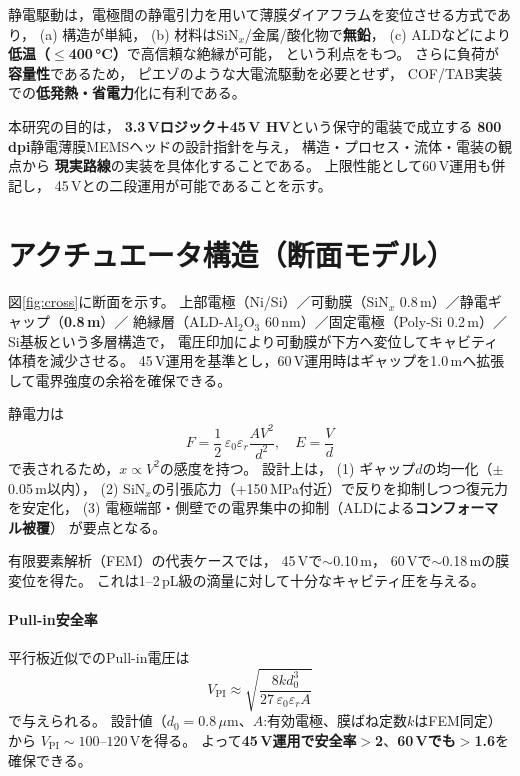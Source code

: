\documentclass[conference]{IEEEtran}
\begin{document}
静電駆動は，電極間の静電引力を用いて薄膜ダイアフラムを変位させる方式であり，
(a) 構造が単純，
(b) 材料はSiN$_x$/金属/酸化物で\textbf{無鉛}，
(c) ALDなどにより\textbf{低温（$\le$400\,\si{\celsius}）}で高信頼な絶縁が可能，
という利点をもつ。
さらに負荷が\textbf{容量性}であるため，
ピエゾのような大電流駆動を必要とせず，
COF/TAB実装での\textbf{低発熱・省電力}化に有利である。

本研究の目的は，
\textbf{3.3\,Vロジック＋45\,V HV}という保守的電装で成立する
\textbf{800\,dpi}静電薄膜MEMSヘッドの設計指針を与え，
構造・プロセス・流体・電装の観点から
\textbf{現実路線}の実装を具体化することである。
上限性能として60\,V運用も併記し，
45\,Vとの二段運用が可能であることを示す。

\section{アクチュエータ構造（断面モデル）}
図\ref{fig:cross}に断面を示す。
上部電極（Ni/Si）／可動膜（SiN$_x$ 0.8\,\textmu m）／静電ギャップ（\textbf{0.8\,\textmu m}）／
絶縁層（ALD-Al$_2$O$_3$ 60\,nm）／固定電極（Poly-Si 0.2\,\textmu m）／Si基板という多層構造で，
電圧印加により可動膜が下方へ変位してキャビティ体積を減少させる。
45\,V運用を基準とし，60\,V運用時はギャップを1.0\,\textmu mへ拡張して電界強度の余裕を確保できる。

静電力は
\[
F=\frac{1}{2}\,\varepsilon_0\varepsilon_r\frac{AV^2}{d^2},\quad E=\frac{V}{d}
\]
で表されるため，$x\!\propto\!V^2$の感度を持つ。
設計上は，
(1) ギャップ$d$の均一化（$\pm$0.05\,\textmu m以内），
(2) SiN$_x$の引張応力（+150\,MPa付近）で反りを抑制しつつ復元力を安定化，
(3) 電極端部・側壁での電界集中の抑制（ALDによる\textbf{コンフォーマル被覆}）
が要点となる。

有限要素解析（FEM）の代表ケースでは，
45\,Vで$\sim$0.10\,\textmu m，
60\,Vで$\sim$0.18\,\textmu mの膜変位を得た。
これは1--2\,pL級の滴量に対して十分なキャビティ圧を与える。

\paragraph*{Pull-in安全率}
平行板近似でのPull-in電圧は
\[
V_{\text{PI}}\approx \sqrt{\frac{8 k d_0^3}{27\,\varepsilon_0\varepsilon_r A}}
\]
で与えられる。
設計値（$d_0\!=\!0.8\,\mu$m、$A$:有効電極、膜ばね定数$k$はFEM同定）から
$V_{\text{PI}}\!\sim\!100$--$120$\,Vを得る。
よって\textbf{45\,V運用で安全率$>$2}、\textbf{60\,Vでも$>$1.6}を確保できる。
\end{document}
